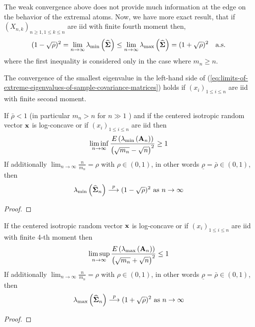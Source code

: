 The weak convergence above does not provide much information at the edge on the behavior of the extremal atoms. Now, we have more exact result, that if $\left(X_{n,k}\right)_{n\geq 1,1\leq k\leq n}$ are iid with finite fourth moment then,
\begin{equation} \label{eq:limits-of-extreme-eigenvalues-of-sample-covariance-matrices}
	(1-\sqrt{\rho})^{2}=\lim_{n\rightarrow\infty}\lambda_{\min}\left(\widehat{\boldsymbol{\Sigma}}\right)\leq\lim_{n\rightarrow\infty}\lambda_{\max}\left(\widehat{\boldsymbol{\Sigma}}\right)=(1+\sqrt{\rho})^{2}\quad\text{a.s.}
\end{equation}
where the first inequality is considered only in the case where $m_{n}\geq n$.

\begin{remark}
	The convergence of the smallest eigenvalue in the left-hand side of (\ref{eq:limits-of-extreme-eigenvalues-of-sample-covariance-matrices}) holds if $\left(x_{i}\right)_{1\leq i\leq n}$ are iid with finite second moment.
\end{remark}

\begin{theorem}
	If $\bar{\rho}<1$ (in particular $m_{n}>n$ for $n\gg 1$ ) and if the centered isotropic random vector ${\bf x}$ is log-concave or if $\left(x_{i}\right)_{1\leq i\leq n}$ are iid then
	\begin{equation}
		\liminf_{n\rightarrow\infty}\frac{E\left(\lambda_{\min}\left({\bf A}_{n}\right)\right)}{\left(\sqrt{m_{n}}-\sqrt{n}\right)^{2}}\geq 1
	\end{equation}
	If additionally $\lim_{n\rightarrow\infty}\frac{n}{m_{n}}=\rho$ with $\rho \in(0,1)$, in other words $\underline{\rho}=\bar{\rho}\in(0,1)$, then
	\begin{equation}
		\lambda_{\min}\left(\widehat{\bfSigma}_{n}\right)\stackrel{p}{\longrightarrow}(1-\sqrt{\rho})^{2}\ \text{as}\ n\rightarrow\infty
	\end{equation}
\end{theorem}

\begin{proof}

\end{proof}

\begin{theorem}
	If the centered isotropic random vector ${\bf x}$ is log-concave or if $\left(x_{i}\right)_{1\leq i\leq n}$ are iid with finite 4-th moment then
	\begin{equation}
		\limsup_{n\rightarrow\infty}\frac{E\left(\lambda_{\max}\left({\bf A}_{n}\right)\right)}{\left(\sqrt{m_{n}}+\sqrt{n}\right)^{2}}\leq 1
	\end{equation}
	If additionally $\lim_{n\rightarrow\infty}\frac{n}{m_{n}}=\rho$ with $\rho \in(0,1)$, in other words $\underline{\rho}=\bar{\rho}\in(0,1)$, then
	\begin{equation}
		\lambda_{\max}\left(\widehat{\bfSigma}_{n}\right)\stackrel{p}{\longrightarrow}(1+\sqrt{\rho})^{2}\ \text{as}\ n\rightarrow\infty
	\end{equation}
\end{theorem}

\begin{proof}

\end{proof}
